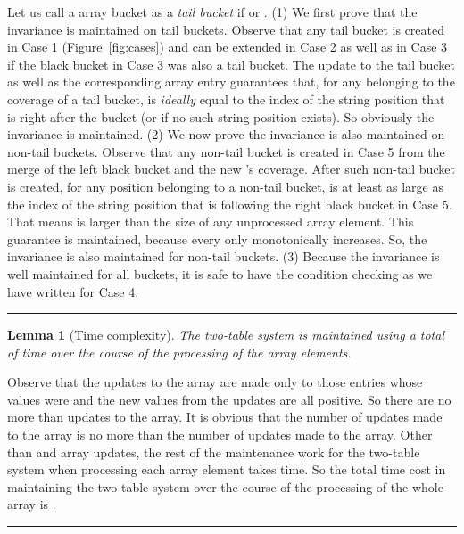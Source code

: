 \documentclass[preprint]{elsarticle}
\newtheorem{lemma}{Lemma}[section]
\newcommand{\qedsymb}{\hfill{\rule{2mm}{2mm}}}
\newenvironment{proofsketch}{\begin{trivlist}
\item[\hspace{\labelsep}{\noindent Proof Sketch: }]
}{\qedsymb\end{trivlist}}
\begin{document}
\begin{proofsketch}
  Let us call a  array bucket  as a \emph{tail
    bucket} if  or .  (1) We first prove that the
  invariance is maintained on tail buckets.  Observe that any tail
   bucket is created in Case 1 (Figure~\ref{fig:cases}) and can
  be extended in Case 2 as well as in Case 3 if the black bucket in
  Case 3 was also a tail bucket.  The update to the tail bucket as
  well as the corresponding  array entry guarantees that, for
  any  belonging to the coverage of a tail bucket,
   is \emph{ideally} equal to the index of the
  string position that is right after the bucket (or  if no such
  string position exists). So obviously the invariance is maintained.
  (2) We now prove the invariance is also maintained on non-tail
  buckets.  Observe that any non-tail bucket is created in Case 5 from
  the merge of the left black bucket and the new 's
  coverage. After such non-tail bucket is created, for any position
   belonging to a non-tail bucket,  is at
  least as large as the index of the string position that is following
  the right black bucket in Case 5. That means  is larger than the size of any unprocessed  array
  element. This guarantee is maintained, because every
   only monotonically increases.  So, the
  invariance is also maintained for non-tail buckets. (3) Because the
  invariance is well maintained for all  buckets, it is safe to
  have the condition checking as we have written for Case 4.
\end{proofsketch}






\begin{lemma}[Time complexity]
\label{lem:table-time}
  The two-table system is maintained using a total of  time
  over the course of the processing of the  array elements. 
\end{lemma}


\begin{proofsketch}
  Observe that the updates to the  array are made only to those
  entries whose values were  and the new values from the updates
  are all positive. So there are no more than  updates
  to the  array. It is obvious that the number of updates made to
  the  array is no more than the number of updates made to the
   array. Other than  and  array updates, the rest of
  the maintenance work for the two-table system when processing each
   array element takes  time.  So the total time cost
  in maintaining the two-table system over the course of the
  processing of the whole  array is .
\end{proofsketch}
\end{document}
